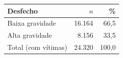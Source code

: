 \begin{tabular}{@{}lrr@{}}
\toprule
\textbf{Desfecho} & \textbf{$n$} & \textbf{\%} \\
\midrule
Baixa gravidade & 16.164 & 66,5 \\
Alta gravidade & 8.156 & 33,5 \\
\midrule
Total (com v\'itimas) & 24.320 & 100,0 \\
\bottomrule
\end{tabular}